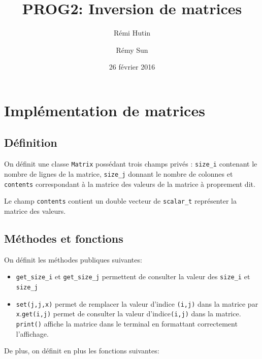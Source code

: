 \documentclass[a4paper,11pt]{article}
\title{PROG2: Inversion de matrices}
\author{Rémi Hutin \and Rémy Sun}
\date{26 février 2016}
\begin{document}
\maketitle

\begin{abstract}

\end{abstract}

\section{Implémentation de matrices}

\subsection{Définition}

On définit une classe \texttt{Matrix} possédant trois champs privés : \texttt{size\_i} contenant le nombre de lignes de la matrice, \texttt{size\_j} donnant le nombre de colonnes et
 \texttt{contents} correspondant à la matrice des valeurs de la matrice à proprement dit.

Le champ  \texttt{contents}  contient un double vecteur de \texttt{scalar\_t} représenter la matrice des valeurs.

\subsection{Méthodes et fonctions}

On définit les méthodes publiques suivantes:

\begin{itemize}
\item \texttt{get\_size\_i} et \texttt{get\_size\_j} permettent de consulter la valeur des \texttt{size\_i} et \texttt{size\_j}
\item \texttt{set(j,j,x)} permet de remplacer la valeur d'indice \texttt{(i,j)} dans la matrice par \texttt{x}.\texttt{get(i,j)} permet de consulter la valeur d'indice\texttt{(i,j)} dans la matrice. \texttt{print()} affiche la matrice dans le terminal en formattant correctement l'affichage.
\end{itemize}

De plus, on définit en plus les fonctions suivantes:
\end{document}
